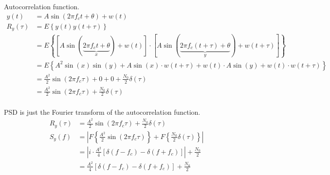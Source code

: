 \documentclass[12pt]{article}
\begin{document}
Autocorrelation function.
\begin{equation*}
\begin{aligned}
	y(t) &= A\sin(2\pi f_ct + \theta) + w(t) \\
	R_y(\tau) &= E\left\{y(t)y(t+\tau)\right\} \\
	&= E\left \{\left[ A\sin(\underbrace{2 \pi f_c t + \theta}_{x}) + w(t) \right]\cdot \left[ A\sin(\underbrace{2 \pi f_c (t+\tau) + \theta}_{y}) + w(t+\tau) \right] \right \} \\
	&= E\left \{A^2\sin(x)\sin(y) + A\sin(x)\cdot w(t+\tau) + w(t)\cdot A\sin(y) + w(t)\cdot w(t+\tau)\right \} \\
	&= \frac{A^2}{2}\sin(2\pi f_c \tau) + 0 + 0 + \frac{N_0}{2}\delta(\tau) \\
	&= \frac{A^2}{2} \sin(2\pi f_c \tau) + \frac{N_0}{2}\delta(\tau) \\
\end{aligned}
\end{equation*}

PSD is just the Fourier transform of the autocorrelation function.
\begin{equation*}
\begin{aligned}
	R_y(\tau) &= \frac{A^2}{2} \sin(2\pi f_c \tau) + \frac{N_0}{2}\delta(\tau) \\
	S_y(f) &= \left |F\left \{\frac{A^2}{2} \sin(2\pi f_c \tau) \right \} + F\left \{\frac{N_0}{2}\delta(\tau) \right \}\right | \\
	&= \left | i \cdot \frac{A^2}{4} \left [\delta(f - f_c) - \delta(f + f_c)\right ]\right | + \frac{N_0}{2} \\
	&= \frac{A^2}{4} \left [\delta(f - f_c) - \delta(f + f_c)\right ] + \frac{N_0}{2}
\end{aligned}
\end{equation*}


\end{document}

